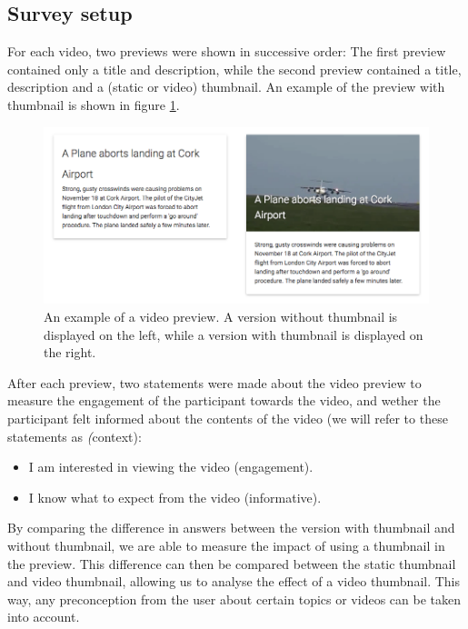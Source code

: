 \documentclass{../resources/sig-alternate-05-2015}
\begin{document}
\subsection{Survey setup}
For each video, two previews were shown in successive order: The first preview contained only a title and description, while the second preview contained a title, description and a (static or video) thumbnail. An example of the preview with thumbnail is shown in figure \ref{survey preview}.

\begin{figure}[h]
  \label{survey preview}
  \includegraphics[width=\linewidth]{resources/preview-combined.png}
  \caption{An example of a video preview. A version without thumbnail is displayed on the left, while a version with thumbnail is displayed on the right.}
\end{figure}


After each preview, two statements were made about the video preview to measure the engagement of the participant towards the video, and wether the participant felt informed about the contents of the video (we will refer to these statements as \textit(context):

\begin{itemize}
	\item I am interested in viewing the video (engagement).
	\item I know what to expect from the video (informative).
\end{itemize}

By comparing the difference in answers between the version with thumbnail and without thumbnail, we are able to measure the impact of using a thumbnail in the preview. This difference can then be compared between the static thumbnail and video thumbnail, allowing us to analyse the effect of a video thumbnail. This way, any preconception from the user about certain topics or videos can be taken into account.
\end{document}
